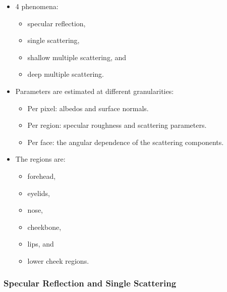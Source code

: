 \documentclass[10pt]{article}
\begin{document}
  	\begin{itemize}
  		\item 4 phenomena:
  		\begin{itemize}
  			\item specular reflection,
  			\item single scattering,
  			\item shallow multiple scattering, and
  			\item deep multiple scattering.
  		\end{itemize}
  		\item Parameters are estimated at different granularities:
  		\begin{itemize}
  			\item Per pixel: albedos and surface normals.
  			\item Per region: specular roughness and scattering parameters.
  			\item Per face: the angular dependence of the scattering components. 
  		\end{itemize}
  		\item The regions are:
  		\begin{itemize}
  			\item forehead,
  			\item eyelids,
  			\item nose,
  			\item cheekbone,
  			\item lips, and
  			\item lower cheek regions.
  		\end{itemize}
  	\end{itemize}

  	\subsubsection{Specular Reflection and Single Scattering}
\end{document}
